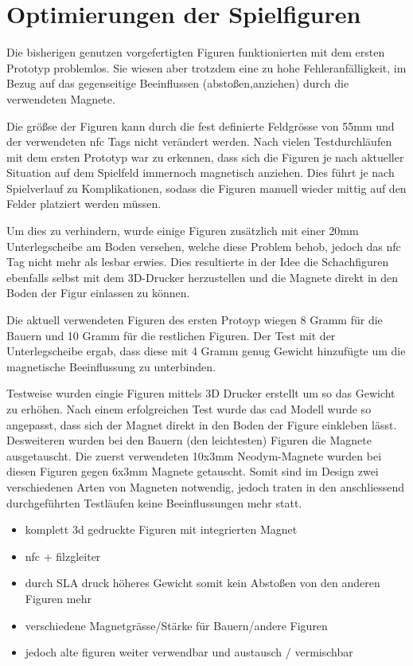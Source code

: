 \hypertarget{optimierungen-der-spielfiguren}{%
\section{Optimierungen der
Spielfiguren}\label{optimierungen-der-spielfiguren}}

Die bisherigen genutzen vorgefertigten Figuren funktionierten mit dem
ersten Prototyp problemlos. Sie wiesen aber trotzdem eine zu hohe
Fehleranfälligkeit, im Bezug auf das gegenseitige Beeinflussen
(abstoßen,anziehen) durch die verwendeten Magnete.

Die größse der Figuren kann durch die fest definierte Feldgrösse von
55mm und der verwendeten \gls{nfc} Tags nicht verändert werden. Nach
vielen Testdurchläufen mit dem ersten Prototyp war zu erkennen, dass
sich die Figuren je nach aktueller Situation auf dem Spielfeld immernoch
magnetisch anziehen. Dies führt je nach Spielverlauf zu Komplikationen,
sodass die Figuren manuell wieder mittig auf den Felder platziert werden
müssen.

Um dies zu verhindern, wurde einige Figuren zusätzlich mit einer 20mm
Unterlegscheibe am Boden versehen, welche diese Problem behob, jedoch
das \gls{nfc} Tag nicht mehr als lesbar erwies. Dies resultierte in der
Idee die Schachfiguren ebenfalls selbst mit dem 3D-Drucker herzustellen
und die Magnete direkt in den Boden der Figur einlassen zu können.

Die aktuell verwendeten Figuren des ersten Protoyp wiegen 8 Gramm für
die Bauern und 10 Gramm für die restlichen Figuren. Der Test mit der
Unterlegscheibe ergab, dass diese mit 4 Gramm genug Gewicht hinzufügte
um die magnetische Beeinflussung zu unterbinden.

Testweise wurden eingie Figuren mittels 3D Drucker erstellt um so das
Gewicht zu erhöhen. Nach einem erfolgreichen Test wurde das \gls{cad}
Modell wurde so angepasst, dass sich der Magnet direkt in den Boden der
Figure einkleben lässt. Desweiteren wurden bei den Bauern (den
leichtesten) Figuren die Magnete ausgetauscht. Die zuerst verwendeten
10x3mm Neodym-Magnete wurden bei diesen Figuren gegen 6x3mm Magnete
getauscht. Somit sind im Design zwei verschiedenen Arten von Magneten
notwendig, jedoch traten in den anschliessend durchgeführten Testläufen
keine Beeinflussungen mehr statt.

\begin{itemize}
\item
  komplett 3d gedruckte Figuren mit integrierten Magnet
\item
  nfc + filzgleiter
\item
  durch SLA druck höheres Gewicht somit kein Abstoßen von den anderen
  Figuren mehr
\item
  verschiedene Magnetgrässe/Stärke für Bauern/andere Figuren
\item
  jedoch alte figuren weiter verwendbar und austausch / vermischbar
\end{itemize}

